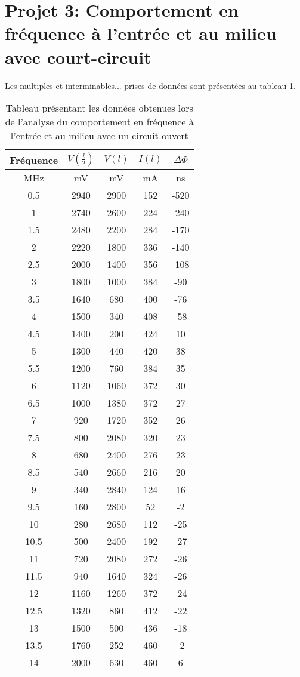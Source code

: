 \section{Projet 3: Comportement en fréquence à l'entrée et au milieu avec court-circuit}
Les multiples et interminables... prises de données sont présentées au tableau \ref{tab:3}.
\begin{table}[htbp]
  \centering
    \begin{tabular}{|c|c|c|c|c|}\hline
    Fréquence & $V\left(\frac{l}{2}\right)$ & $V(l)$ & $I(l)$ & $\Delta \Phi$ \\\hline
    MHz   & mV    & mV    & mA    & ns \\\hline
    0.5   & 2940  & 2900  & 152   & -520 \\
    1     & 2740  & 2600  & 224   & -240 \\
    1.5   & 2480  & 2200  & 284   & -170 \\
    2     & 2220  & 1800  & 336   & -140 \\
    2.5   & 2000  & 1400  & 356   & -108 \\
    3     & 1800  & 1000  & 384   & -90 \\
    3.5   & 1640  & 680   & 400   & -76 \\
    4     & 1500  & 340   & 408   & -58 \\
    4.5   & 1400  & 200   & 424   & 10 \\
    5     & 1300  & 440   & 420   & 38 \\
    5.5   & 1200  & 760   & 384   & 35 \\
    6     & 1120  & 1060  & 372   & 30 \\
    6.5   & 1000  & 1380  & 372   & 27 \\
    7     & 920   & 1720  & 352   & 26 \\
    7.5   & 800   & 2080  & 320   & 23 \\
    8     & 680   & 2400  & 276   & 23 \\
    8.5   & 540   & 2660  & 216   & 20 \\
    9     & 340   & 2840  & 124   & 16 \\
    9.5   & 160   & 2800  & 52    & -2 \\
    10    & 280   & 2680  & 112   & -25 \\
    10.5  & 500   & 2400  & 192   & -27 \\
    11    & 720   & 2080  & 272   & -26 \\
    11.5  & 940   & 1640  & 324   & -26 \\
    12    & 1160  & 1260  & 372   & -24 \\
    12.5  & 1320  & 860   & 412   & -22 \\
    13    & 1500  & 500   & 436   & -18 \\
    13.5  & 1760  & 252   & 460   & -2 \\
    14    & 2000  & 630   & 460   & 6 \\\hline
    \end{tabular}%
   \caption{Tableau présentant les données obtenues lors de l'analyse du comportement en fréquence à l'entrée et au milieu avec un circuit ouvert}
  \label{tab:3}%
\end{table}%

